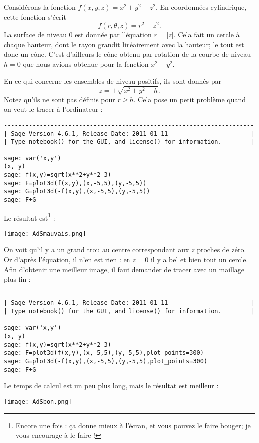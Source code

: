 \begin{example}
    Considérons la fonction $f(x,y,z)=x^2+y^2-z^2$. En coordonnées cylindrique, cette fonction s'écrit
    \begin{equation}
        f(r,\theta,z)=r^2-z^2.
    \end{equation}
    La surface de niveau $0$ est donnée par l'équation $r=| z |$. Cela fait un cercle à chaque hauteur, dont le rayon grandit linéairement avec la hauteur; le tout est donc un cône. C'est d'ailleurs le cône obtenu par rotation de la courbe de niveau $h=0$ que nous avions obtenue pour la fonction $x^2-y^2$.

    En ce qui concerne les ensembles de niveau positifs, ils sont donnés par
    \begin{equation}
        z=\pm\sqrt{x^2+y^2-h}.
    \end{equation}
    Notez qu'ils ne sont pas définis pour $r\geq h$. Cela pose un petit problème quand on veut le tracer à l'ordinateur :
    \begin{verbatim}
----------------------------------------------------------------------
| Sage Version 4.6.1, Release Date: 2011-01-11                       |
| Type notebook() for the GUI, and license() for information.        |
----------------------------------------------------------------------
sage: var('x,y')
(x, y)
sage: f(x,y)=sqrt(x**2+y**2-3)
sage: F=plot3d(f(x,y),(x,-5,5),(y,-5,5)) 
sage: G=plot3d(-f(x,y),(x,-5,5),(y,-5,5))    
sage: F+G
    \end{verbatim}
Le résultat est\footnote{Encore une fois : ça donne mieux à l'écran, et vous pouvez le faire bouger; je vous encourage à le faire !} :
    \begin{center}
            \texttt{[image: AdSmauvais.png]}
    \end{center}
    On voit qu'il y a un grand trou au centre correspondant aux $z$ proches de zéro. Or d'après l'équation, il n'en est rien : en $z=0$ il y a bel et bien tout un cercle. Afin d'obtenir une meilleur image, il faut demander de tracer avec un maillage plus fin :
    \begin{verbatim}
----------------------------------------------------------------------
| Sage Version 4.6.1, Release Date: 2011-01-11                       |
| Type notebook() for the GUI, and license() for information.        |
----------------------------------------------------------------------
sage: var('x,y')
(x, y)
sage: f(x,y)=sqrt(x**2+y**2-3)
sage: F=plot3d(f(x,y),(x,-5,5),(y,-5,5),plot_points=300) 
sage: G=plot3d(-f(x,y),(x,-5,5),(y,-5,5),plot_points=300)
sage: F+G
    \end{verbatim}
    Le temps de calcul est un peu plus long, mais le résultat est meilleur :
    \begin{center}
            \texttt{[image: AdSbon.png]}
    \end{center}
\end{example}

